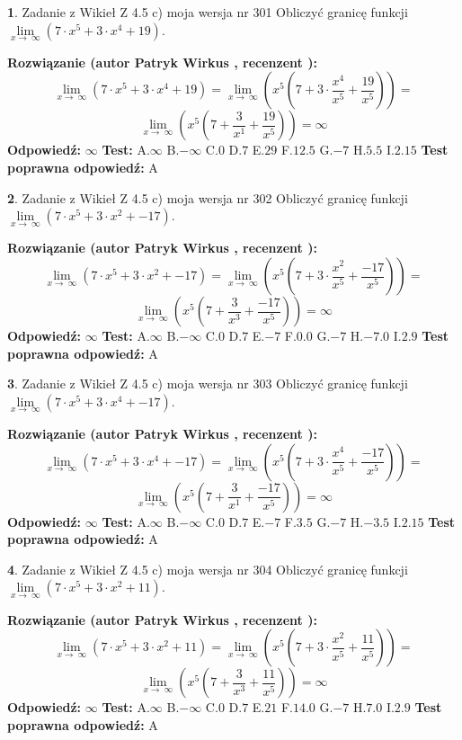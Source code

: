\documentclass[12pt, a4paper]{article}
\theoremstyle{definition} %
\newtheorem{zad}{}
\newcommand{\zadStart}[1]{\begin{zad}#1\newline}
\newcommand{\zadStop}{\end{zad}}
\newcommand{\rozwStart}[2]{\noindent \textbf{Rozwiązanie (autor #1 , recenzent #2): }\newline}
\newcommand{\rozwStop}{\newline}
\newcommand{\odpStart}{\noindent \textbf{Odpowiedź:}\newline}
\newcommand{\odpStop}{\newline}
\newcommand{\testStart}{\noindent \textbf{Test:}\newline}
\newcommand{\testStop}{\newline}
\newcommand{\kluczStart}{\noindent \textbf{Test poprawna odpowiedź:}\newline}
\newcommand{\kluczStop}{\newline}
\begin{document}
\zadStart{Zadanie z Wikieł Z 4.5 c) moja wersja nr 301}
Obliczyć granicę funkcji  $\lim\limits_{x\to\ \infty}(7 \cdot x^{5}+3 \cdot x^{4}+19)$.
\zadStop
\rozwStart{Patryk Wirkus}{}
$$\lim\limits_{x\to\ \infty}(7 \cdot x^{5}+3 \cdot x^{4}+19) = \lim\limits_{x\to\ \infty}(x^{5}(7 +3 \cdot \frac{x^{4}}{x^{5}}+\frac{19}{x^{5}})) =$$ $$\lim\limits_{x\to\ \infty}(x^{5}(7 +\frac{3}{x^{1}}+\frac{19}{x^{5}})) =\infty$$
\rozwStop
\odpStart
$\infty$
\odpStop
\testStart
A.$\infty$ B.$-\infty$ C.$0$ D.$7$ E.$29$
F.$12.5$ G.$-7$
H.$5.5$
I.$2.15$
\testStop
\kluczStart
A
\kluczStop



\zadStart{Zadanie z Wikieł Z 4.5 c) moja wersja nr 302}
Obliczyć granicę funkcji  $\lim\limits_{x\to\ \infty}(7 \cdot x^{5}+3 \cdot x^{2}+-17)$.
\zadStop
\rozwStart{Patryk Wirkus}{}
$$\lim\limits_{x\to\ \infty}(7 \cdot x^{5}+3 \cdot x^{2}+-17) = \lim\limits_{x\to\ \infty}(x^{5}(7 +3 \cdot \frac{x^{2}}{x^{5}}+\frac{-17}{x^{5}})) =$$ $$\lim\limits_{x\to\ \infty}(x^{5}(7 +\frac{3}{x^{3}}+\frac{-17}{x^{5}})) =\infty$$
\rozwStop
\odpStart
$\infty$
\odpStop
\testStart
A.$\infty$ B.$-\infty$ C.$0$ D.$7$ E.$-7$
F.$0.0$ G.$-7$
H.$-7.0$
I.$2.9$
\testStop
\kluczStart
A
\kluczStop



\zadStart{Zadanie z Wikieł Z 4.5 c) moja wersja nr 303}
Obliczyć granicę funkcji  $\lim\limits_{x\to\ \infty}(7 \cdot x^{5}+3 \cdot x^{4}+-17)$.
\zadStop
\rozwStart{Patryk Wirkus}{}
$$\lim\limits_{x\to\ \infty}(7 \cdot x^{5}+3 \cdot x^{4}+-17) = \lim\limits_{x\to\ \infty}(x^{5}(7 +3 \cdot \frac{x^{4}}{x^{5}}+\frac{-17}{x^{5}})) =$$ $$\lim\limits_{x\to\ \infty}(x^{5}(7 +\frac{3}{x^{1}}+\frac{-17}{x^{5}})) =\infty$$
\rozwStop
\odpStart
$\infty$
\odpStop
\testStart
A.$\infty$ B.$-\infty$ C.$0$ D.$7$ E.$-7$
F.$3.5$ G.$-7$
H.$-3.5$
I.$2.15$
\testStop
\kluczStart
A
\kluczStop



\zadStart{Zadanie z Wikieł Z 4.5 c) moja wersja nr 304}
Obliczyć granicę funkcji  $\lim\limits_{x\to\ \infty}(7 \cdot x^{5}+3 \cdot x^{2}+11)$.
\zadStop
\rozwStart{Patryk Wirkus}{}
$$\lim\limits_{x\to\ \infty}(7 \cdot x^{5}+3 \cdot x^{2}+11) = \lim\limits_{x\to\ \infty}(x^{5}(7 +3 \cdot \frac{x^{2}}{x^{5}}+\frac{11}{x^{5}})) =$$ $$\lim\limits_{x\to\ \infty}(x^{5}(7 +\frac{3}{x^{3}}+\frac{11}{x^{5}})) =\infty$$
\rozwStop
\odpStart
$\infty$
\odpStop
\testStart
A.$\infty$ B.$-\infty$ C.$0$ D.$7$ E.$21$
F.$14.0$ G.$-7$
H.$7.0$
I.$2.9$
\testStop
\kluczStart
A
\kluczStop
\end{document}
